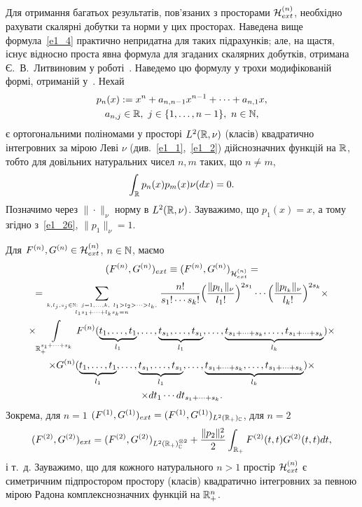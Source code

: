 Для отримання багатьох результатів, пов'язаних з просторами $\mathcal{H}_{ext}^{(n)}$, необхідно рахувати скалярні добутки та норми у цих просторах. 
Наведена вище формула~\eqref{e1_4} практично непридатна для таких підрахунків; але, на щастя, існує відносно проста явна формула для згаданих скалярних добутків, отримана Є.~В.~Литвиновим у роботі~\cite{L03}. Наведемо цю формулу у трохи модифікованій формі, отриманій у~\cite{K13}. 
Нехай
\begin{gather*}
    p_n(x):=x^n+a_{n,n-1}x^{n-1}+\cdots+a_{n,1}x, \\
    a_{n,j}\in\mathbb{R},\ j\in\{1,\dots,n-1\},\ n\in\mathbb{N},
\end{gather*}
є ортогональними поліномами у просторі $L^2(\mathbb{R},\nu)$ (класів) квадратично інтегровних за мірою Леві $\nu$ (див.~\eqref{e1_1},~\eqref{e1_2}) дійснозначних функцій на $\mathbb{R}$, тобто для довільних натуральних чисел $n,m$ таких, що $n\not=m$, 
\[ \int_{\mathbb{R}}p_n(x)p_m(x)\nu(dx)=0.\]
Позначимо через $\|\cdot\|_\nu$ норму в $L^2(\mathbb{R},\nu)$.
Зауважимо, що $p_1(x)=x$, а тому згідно з~\eqref{e1_26}, $\|p_1\|_\nu=1$.

Для $F^{(n)},G^{(n)}\in\mathcal{H}_{ext}^{(n)}$, $n\in\mathbb{N}$, маємо
\begin{equation}\label{e1_7}
\begin{gathered}
(F^{(n)},G^{(n)})_{ext}
\equiv (F^{(n)},G^{(n)})_{\Hcal_{ext}^{(n)}}=\\
=\sum_{{k,l_j,s_j\in\bN:
\ j=1,\dots,k,\ l_1>l_2>\cdots>l_k,}\atop{l_1s_1+\cdots+l_ks_k=n}}
\frac{n!}{s_1!\cdots s_k!}
\Big(\frac{\|p_{l_1}\|_\nu}{l_1!}\Big)^{2s_1}
\cdots\Big(\frac{\|p_{l_k}\|_\nu}{l_k!}\Big)^{2s_k}\times\\
\times\int\limits_{\bR_+^{s_1+\cdots+s_k}}F^{(n)}(
\underset{l_1}{\underbrace{t_1,\dots,t_1}},\dots,
\underset{l_1}{\underbrace{t_{s_1},\dots,t_{s_1}}},\dots,
\underset{l_k}{\underbrace{t_{s_1+\cdots+s_k},\dots,
t_{s_1+\cdots+s_k}}})\times\\
\times G^{(n)}(
\underset{l_1}{\underbrace{t_1,\dots,t_1}},\dots,
\underset{l_1}{\underbrace{t_{s_1},\dots,t_{s_1}}},\dots,
\underset{l_k}{\underbrace{t_{s_1+\cdots+s_k},\dots,
t_{s_1+\cdots+s_k}}})\times\\
\times dt_1\cdots dt_{s_1+\cdots+s_k}.
\end{gathered}
\end{equation}
Зокрема, для $n=1$
$(F^{(1)},G^{(1)})_{ext}=(F^{(1)},G^{(1)})_{L^2(\mathbb{R}_+)_{\mathbb{C}}}$,
для $n=2$
\begin{gather*}
(F^{(2)},G^{(2)})_{ext}
=(F^{(2)},G^{(2)})_{L^2(\mathbb{R}_+)_{\mathbb{C}}^{\otimes 2}}
+\frac{\|p_2\|_\nu^2}{2}\int_{\mathbb{R}_+}F^{(2)}(t,t)G^{(2)}(t,t)dt,
\end{gather*}
і т.~д. Зауважимо, що для кожного натурального $n>1$ простір $\mathcal{H}_{ext}^{(n)}$
є симетричним підпростором простору (класів) квадратично інтегровних за певною
мірою Радона комплекснозначних функцій на $\mathbb{R}_+^n$.

